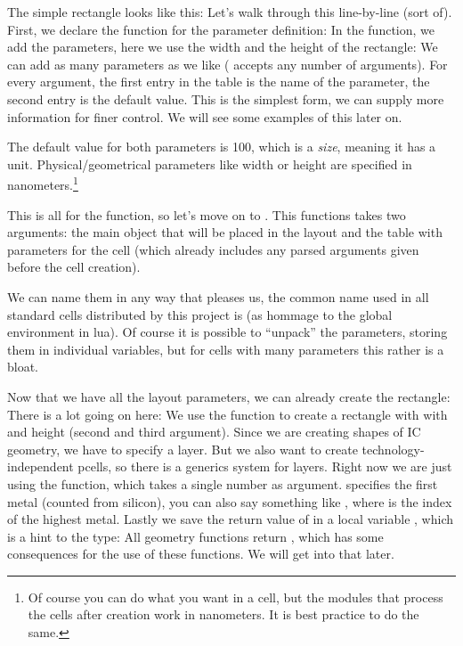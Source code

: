 The simple rectangle looks like this:
Let's walk through this line-by-line (sort of). First, we declare the function for the parameter definition:
In the function, we add the parameters, here we use the width and the height of the rectangle:
We can add as many parameters as we like ( accepts any number of arguments). For every argument, the first entry in the table is
the name of the parameter, the second entry is the default value. This is the simplest form, we can supply more information for finer control. We will see some
examples of this later on.

The default value for both parameters is 100, which is a \emph{size}, meaning it has a unit. Physical/geometrical parameters like width or height are specified
in nanometers.\footnote{Of course you can do what you want in a cell, but the modules that process the cells after creation work in nanometers. It is best
practice to do the same.}

This is all for the  function, so let's move on to . This functions takes two arguments: the main object that will be
placed in the layout and the table with parameters for the cell (which already includes any parsed arguments given before the cell creation). 

We can name them in any way that pleases us, the common name used in all standard cells distributed by this project is  (as hommage to the global
environment  in lua).
Of course it is possible to \enquote{unpack} the parameters, storing them in individual variables, but for cells with many parameters this rather is a bloat.

Now that we have all the layout parameters, we can already create the rectangle:
There is a lot going on here: We use the  function to create a rectangle with with and height (second and third argument). Since we are
creating shapes of IC geometry, we have to specify a layer. But we also want to create technology-independent pcells, so there is a generics system for layers. Right
now we are just using the  function, which takes a single number as argument.  specifies the first metal
(counted from silicon), you can also say something like , where  is the index of the highest metal. Lastly we save the return value
of  in a local variable , which is a hint to the type: All geometry functions return , which has some
consequences for the use of these functions. We will get into that later.

